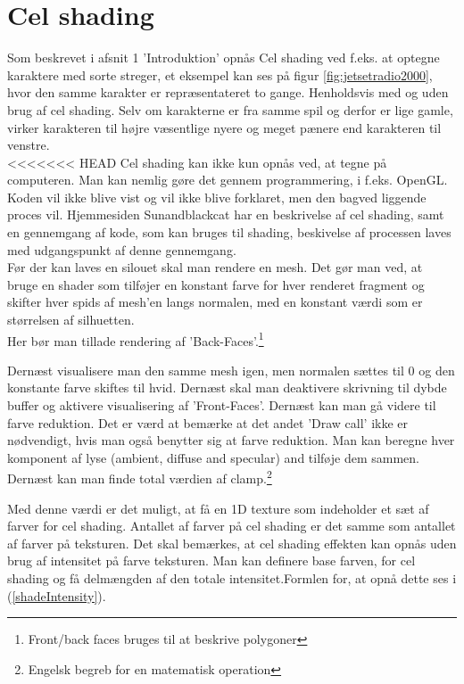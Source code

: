 \section{Cel shading}
Som beskrevet i afsnit 1 'Introduktion' opnås Cel shading ved f.eks. at optegne karaktere med sorte streger, et eksempel kan ses på figur \ref{fig:jetsetradio2000}, hvor den samme karakter er repræsentateret to gange. Henholdsvis med og uden brug af cel shading. Selv om karakterne er fra samme spil og derfor er lige gamle, virker karakteren til højre væsentlige nyere og meget pænere end karakteren til venstre. 
\\
<<<<<<< HEAD
Cel shading kan ikke kun opnås ved, at tegne på computeren. Man kan nemlig gøre det gennem programmering, i f.eks. OpenGL. Koden vil ikke blive vist og vil ikke blive forklaret, men den bagved liggende proces vil. Hjemmesiden Sunandblackcat \cite{sunandblackcat2016} har en beskrivelse af cel shading, samt en gennemgang af kode, som kan bruges til shading, beskivelse af processen laves med udgangspunkt af denne gennemgang.
\\
Før der kan laves en silouet skal man rendere en mesh. Det gør man ved, at bruge en shader som tilføjer en konstant farve for hver renderet fragment og skifter hver spids af mesh’en langs normalen, med en konstant værdi som er størrelsen af silhuetten.
\\ Her bør man tillade rendering af ’Back-Faces’.\footnote[1]{Front/back faces bruges til at beskrive polygoner}

Dernæst visualisere man den samme mesh igen, men normalen sættes til 0 og den konstante farve skiftes til hvid.  Dernæst skal man deaktivere skrivning til dybde buffer og aktivere visualisering af ’Front-Faces’. Dernæst kan man gå videre til farve reduktion. Det er værd at bemærke at det andet ’Draw call’ ikke er nødvendigt, hvis man også benytter sig at farve reduktion. 
Man kan beregne hver komponent af lyse (ambient, diffuse and specular) and tilføje dem sammen. Dernæst kan man finde total værdien af clamp.\footnote[2]{Engelsk begreb for en matematisk operation}

Med denne værdi er det muligt, at få en 1D texture som indeholder et sæt af farver for cel shading. Antallet af farver på cel shading er det samme som antallet af farver på teksturen. Det skal bemærkes, at cel shading effekten kan opnås uden brug af intensitet på farve teksturen. 
Man kan definere base farven, for cel shading og få delmængden af den totale intensitet.Formlen for, at opnå dette ses i (\ref{shadeIntensity}). 
 
